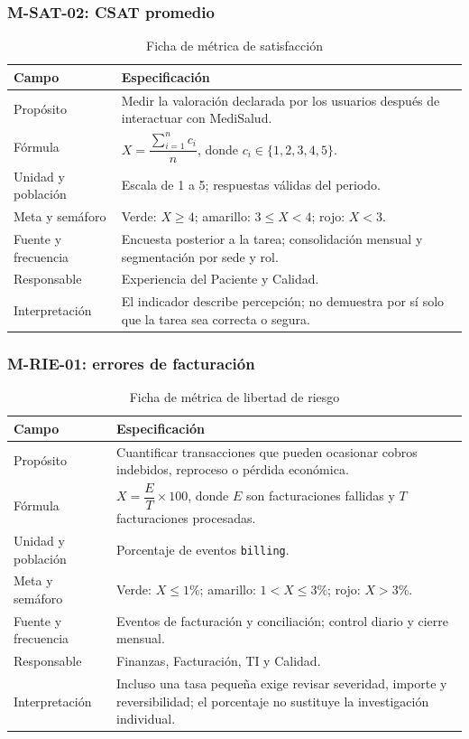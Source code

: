 \subsubsection{M-SAT-02: CSAT promedio}

\begin{table}[H]
\centering
\caption{Ficha de métrica de satisfacción}
\begin{tabularx}{\textwidth}{p{3.3cm}Y}
\toprule
Campo & Especificación \\
\midrule
Propósito & Medir la valoración declarada por los usuarios después de interactuar con MediSalud. \\
Fórmula & $X=\dfrac{\sum_{i=1}^{n}c_i}{n}$, donde $c_i\in\{1,2,3,4,5\}$. \\
Unidad y población & Escala de 1 a 5; respuestas válidas del periodo. \\
Meta y semáforo & Verde: $X\geq4$; amarillo: $3\leq X<4$; rojo: $X<3$. \\
Fuente y frecuencia & Encuesta posterior a la tarea; consolidación mensual y segmentación por sede y rol. \\
Responsable & Experiencia del Paciente y Calidad. \\
Interpretación & El indicador describe percepción; no demuestra por sí solo que la tarea sea correcta o segura. \\
\bottomrule
\end{tabularx}
\end{table}

\subsubsection{M-RIE-01: errores de facturación}

\begin{table}[H]
\centering
\caption{Ficha de métrica de libertad de riesgo}
\begin{tabularx}{\textwidth}{p{3.3cm}Y}
\toprule
Campo & Especificación \\
\midrule
Propósito & Cuantificar transacciones que pueden ocasionar cobros indebidos, reproceso o pérdida económica. \\
Fórmula & $X=\dfrac{E}{T}\times100$, donde $E$ son facturaciones fallidas y $T$ facturaciones procesadas. \\
Unidad y población & Porcentaje de eventos \texttt{billing}. \\
Meta y semáforo & Verde: $X\leq1\%$; amarillo: $1<X\leq3\%$; rojo: $X>3\%$. \\
Fuente y frecuencia & Eventos de facturación y conciliación; control diario y cierre mensual. \\
Responsable & Finanzas, Facturación, TI y Calidad. \\
Interpretación & Incluso una tasa pequeña exige revisar severidad, importe y reversibilidad; el porcentaje no sustituye la investigación individual. \\
\bottomrule
\end{tabularx}
\end{table}

